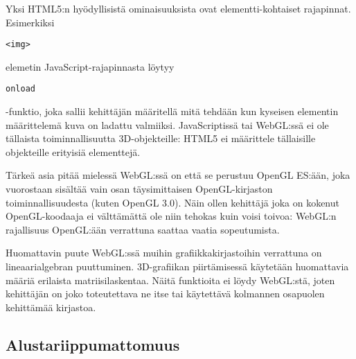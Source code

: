 Yksi HTML5:n hyödyllisistä ominaisuuksista ovat elementti-kohtaiset rajapinnat. Esimerkiksi \begin{verbatim}<img>\end{verbatim}elemetin JavaScript-rajapinnasta löytyy \begin{verbatim}onload\end{verbatim}-funktio, joka sallii kehittäjän määritellä mitä tehdään kun kyseisen elementin määrittelemä kuva on ladattu valmiiksi. JavaScriptissä tai WebGL:ssä ei ole tällaista toiminnallisuutta 3D-objekteille: HTML5 ei määrittele tällaisille objekteille erityisiä elementtejä.

Tärkeä asia pitää mielessä WebGL:ssä on että se perustuu OpenGL ES:ään, joka vuorostaan sisältää vain osan täysimittaisen OpenGL-kirjaston toiminnallisuudesta (kuten OpenGL 3.0)\cite{khronosopenwebgldiff}. Näin ollen kehittäjä joka on kokenut OpenGL-koodaaja ei välttämättä ole niin tehokas kuin voisi toivoa: WebGL:n rajallisuus OpenGL:ään verrattuna saattaa vaatia sopeutumista.

Huomattavin puute WebGL:ssä muihin grafiikkakirjastoihin verrattuna on lineaarialgebran puuttuminen. 3D-grafiikan piirtämisessä käytetään huomattavia määriä erilaista matriisilaskentaa. Näitä funktioita ei löydy WebGL:stä, joten kehittäjän on joko toteutettava ne itse tai käytettävä kolmannen osapuolen kehittämää kirjastoa.
\subsection{Alustariippumattomuus}